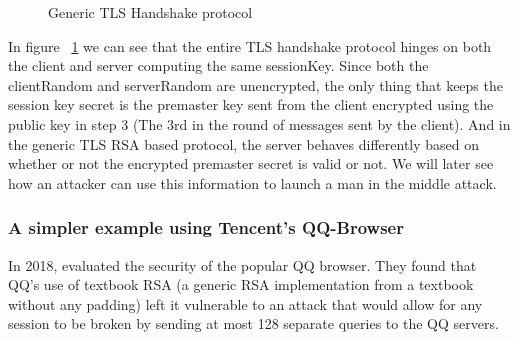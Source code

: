 \begin{figure} [H]
\caption{Generic TLS Handshake protocol} \label{fig:TLS}
\end{figure}

\indent In figure ~\ref{fig:TLS} we can see that the entire TLS handshake protocol hinges on both the client and server computing the same sessionKey. Since both the clientRandom and serverRandom are unencrypted, the only thing that keeps the session key secret is the premaster key sent from the client encrypted using the public key in step 3 (The 3rd in the round of messages sent by the client). And in the generic TLS RSA based protocol, the server behaves differently based on whether or not the encrypted premaster secret is valid or not. We will later see how an attacker can use this information to launch a man in the middle attack.

\subsubsection{A simpler example using Tencent's QQ-Browser}

\indent In 2018, \cite{QQAttack} evaluated the security of the popular QQ browser. They found that QQ's use of textbook RSA (a generic RSA implementation from a textbook without any padding) left it vulnerable to an attack that would allow for any session to be broken by sending at most 128 separate queries to the QQ servers.\newline


